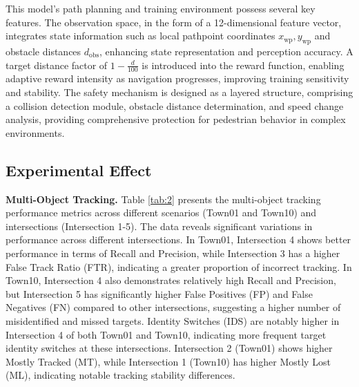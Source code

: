 \documentclass[lettersize,journal]{IEEEtran}
\begin{document}
This model's path planning and training environment possess several key features. 
The observation space, in the form of a 12-dimensional feature vector, integrates state information such as local pathpoint coordinates \(x_{\text{wp}}, y_{\text{wp}}\) and obstacle distances \(d_{\text{obs}}\), enhancing state representation and perception accuracy. 
A target distance factor of \(1 - \frac{d}{100}\) is introduced into the reward function, enabling adaptive reward intensity as navigation progresses, improving training sensitivity and stability. 
The safety mechanism is designed as a layered structure, comprising a collision detection module, obstacle distance determination, and speed change analysis, providing comprehensive protection for pedestrian behavior in complex environments. 



\subsection{Experimental Effect}

\textbf{Multi-Object Tracking.}
Table \ref{tab:2} presents the multi-object tracking performance metrics across different scenarios (Town01 and Town10) and intersections (Intersection 1-5). 
The data reveals significant variations in performance across different intersections. 
In Town01, Intersection 4 shows better performance in terms of Recall and Precision, while Intersection 3 has a higher False Track Ratio (FTR), indicating a greater proportion of incorrect tracking. 
In Town10, Intersection 4 also demonstrates relatively high Recall and Precision, but Intersection 5 has significantly higher False Positives (FP) and False Negatives (FN) compared to other intersections, suggesting a higher number of misidentified and missed targets. 
Identity Switches (IDS) are notably higher in Intersection 4 of both Town01 and Town10, indicating more frequent target identity switches at these intersections. 
Intersection 2 (Town01) shows higher Mostly Tracked (MT), while Intersection 1 (Town10) has higher Mostly Lost (ML), indicating notable tracking stability differences.
\end{document}
